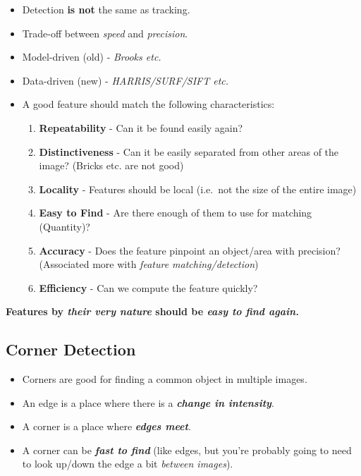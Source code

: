 \documentclass[english, 10pt]{article}
\begin{document}
\begin{itemize}
\item
  Detection \textbf{is not} the same as tracking.
\item
  Trade-off between \emph{speed} and \emph{precision}.
\item
  Model-driven (old) - \emph{Brooks etc.}
\item
  Data-driven (new) - \emph{HARRIS/SURF/SIFT etc.}
\item
  A good feature should match the following characteristics:

  \begin{enumerate}
  \def\labelenumi{\arabic{enumi}.}
  \itemsep1pt\parskip0pt
  \item
    \textbf{Repeatability} - Can it be found easily again?
  \item
    \textbf{Distinctiveness} - Can it be easily separated from other
    areas of the image? (Bricks etc. are not good)
  \item
    \textbf{Locality} - Features should be local (i.e.~not the size of
    the entire image)
  \item
    \textbf{Easy to Find} - Are there enough of them to use for matching
    (Quantity)?
  \item
    \textbf{Accuracy} - Does the feature pinpoint an object/area with
    precision? (Associated more with \emph{feature matching/detection})
  \item
    \textbf{Efficiency} - Can we compute the feature quickly?
  \end{enumerate}
\end{itemize}

\textbf{Features by \textit{their very nature} should be \textit{easy to find again.}}

\subsection{Corner Detection}\label{corner-detection}

\begin{itemize}
\itemsep1pt\parskip0pt
\item
  Corners are good for finding a common object in multiple images.
\item
  An edge is a place where there is a \textbf{\emph{change in
  intensity}}.
\item
  A corner is a place where \textbf{\emph{edges meet}}.
\item
  A corner can be \textbf{\emph{fast to find}} (like edges, but you're
  probably going to need to look up/down the edge a bit \emph{between
  images}).
\end{itemize}
\end{document}
